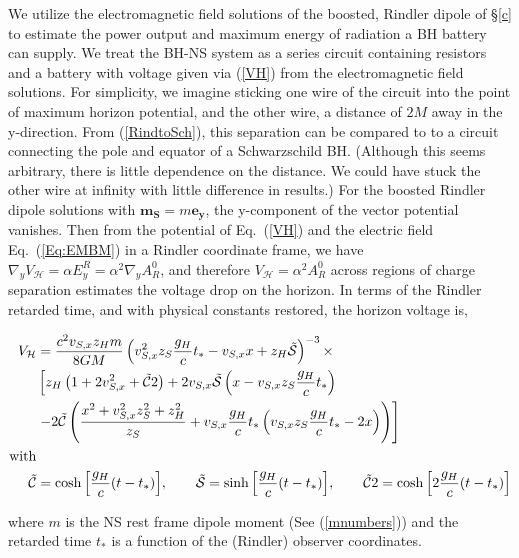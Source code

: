 We utilize the electromagnetic field solutions of the boosted, Rindler
dipole of \S\ref{c} to estimate the power output and
maximum energy of radiation a BH battery can supply. 
We treat the BH-NS system as a series circuit containing
resistors and a battery with voltage given via (\ref{VH}) from the
electromagnetic field solutions. For simplicity, we imagine sticking
one wire of the circuit into the point of maximum horizon potential,
and the other wire, a distance of $2M$ away in the
y-direction. From (\ref{RindtoSch}), this separation can be compared to to a circuit connecting the pole and equator of a Schwarzschild BH. (Although this seems arbitrary, there is little dependence on the distance. We could have stuck the other wire
at infinity with little difference in results.) For
the boosted Rindler dipole solutions with $\mathbf{m_S} = m \mathbf{e_y}$, the y-component of the vector
potential vanishes. Then from the potential of Eq.\ (\ref{VH}) and
the electric field Eq.\ (\ref{Eq:EMBM}) in a Rindler coordinate frame,
we have $ \nabla_y V_{\mathcal{H}} = \alpha E^R_y =
\alpha^2 \nabla_y A^0_R $, and therefore $V_{\mathcal{H}}=\alpha^2 A_R^0$
across regions of charge separation estimates the voltage 
drop on the horizon. In terms of the Rindler retarded time, and with
physical constants restored, the horizon voltage is,
\begin{widetext}
\begin{align}
\label{BoostVolt}
V_{\mathcal{H}} &= \frac{c^2 v_{S, x} z_H m  }{8 G M}  \left(  v^2_{S, x} z_S
\frac{g_H}{c} t_* - v_{S, x} x + z_H \mathcal{\tilde{S}} \right)^{-3} \times   \\ 
& \left [    z_H \left( 1+ 2 v^2_{S, x} + \mathcal{\tilde{C}}2  \right)   + 2  v_{S, x}
  \mathcal{\tilde{S}} \left( x - v_{S, x} z_S \frac{g_H}{c}  t_* \right) \right.   \nonumber  \\
 &\left.  - 2 \mathcal{\tilde{C}}
  \left(\frac{x^2 + v^2_{S, x} z^2_S + z^2_H}{z_S}  + v_{S, x} \frac{g_H}{c}  t_*
  \left(  v_{S, x} z_S \frac{g_H}{c}  t_* - 2 x \right)   \right)
  \right]   \nonumber \\
{\rm with } & \nonumber \\
\mathcal{\tilde{C}} &= \cosh{\left[ \frac{g_H}{c} (t - t_*)\right] }, \qquad
\mathcal{\tilde{S}} = \sinh{\left[ \frac{g_H}{c} (t - t_*)\right] }, \qquad
\mathcal{\tilde{C}}2 = \cosh{\left[ 2 \frac{g_H}{c} (t - t_*)\right] }  \nonumber
\end{align}
\end{widetext}
where $m$ is the NS rest frame dipole moment (See (\ref{mnumbers}))
and the retarded time $t_*$ is a function of the (Rindler) observer coordinates. 

